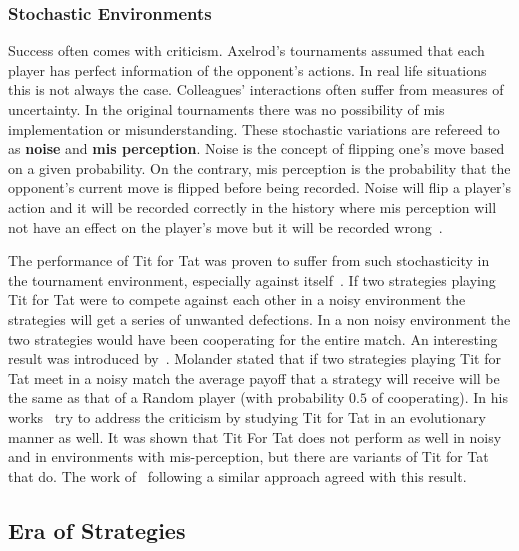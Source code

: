 \documentclass{article}
\begin{document}
\subsubsection{Stochastic Environments}

Success often comes with criticism. Axelrod's tournaments assumed that
each player has perfect information of the opponent's actions. In real life
situations this is not always the case. Colleagues' interactions often suffer from
measures of uncertainty. In the original tournaments there was no possibility of
mis implementation or misunderstanding. These stochastic variations are refereed
to as \textbf{noise} and \textbf{mis perception}. Noise is the concept of flipping
one's move based on a given probability. On the contrary, mis perception is the
probability that the opponent's current move is flipped before being recorded.
Noise will flip a player's action  and it will be recorded correctly in the history
where mis perception will not have an effect on the player's move but it will be
recorded wrong~\cite{Hoffmann1998}.

The performance of Tit for Tat was proven to suffer from such stochasticity in
the tournament environment, especially against itself~\cite{Bendor1991,Godfray1992,
Molander1985, Nowak1992, Wolfgang2006}. If two strategies playing Tit for Tat were
to compete against each other in a noisy environment the strategies will get 
a series of unwanted defections. In a non noisy environment
the two strategies would have been cooperating for the entire match.
An interesting result was introduced by~\cite{Molander1985}. Molander stated
that if two strategies playing Tit for Tat meet in a noisy match the average
payoff that a strategy will receive will be the same as that of a Random player
(with probability \(0.5\) of cooperating).
In his works~\cite{axelrod1988} try to address the criticism by studying Tit for 
Tat in an evolutionary manner as well. It was shown that Tit For Tat does not 
perform as well in noisy and in environments with mis-perception, but there are 
variants of Tit for Tat that do. The work of~\cite{Nowak1990} following a similar
approach agreed with this result.


\subsection{Era of Strategies}
\end{document}
